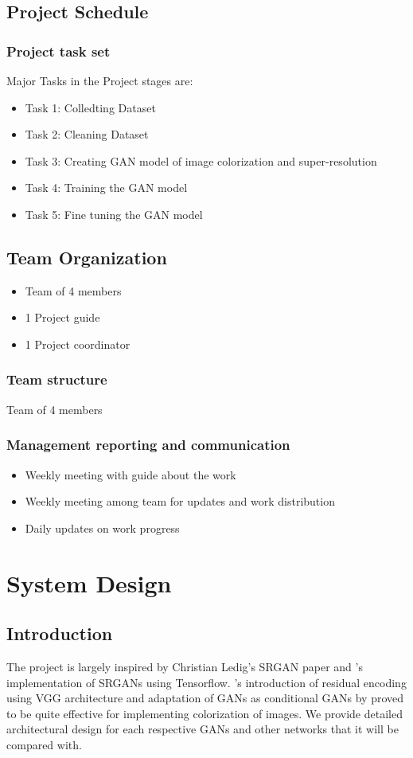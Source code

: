 \documentclass[oneside,a4paper,12pt]{report}
\begin{document}
\newpage
\section{Project Schedule}
\subsection{Project task set}
Major Tasks in the Project stages are:
\begin{itemize}
  \item Task 1: Colledting Dataset
  \item Task 2: Cleaning Dataset
  \item Task 3: Creating GAN model of image colorization and super-resolution
  \item Task 4: Training  the GAN model
  \item Task 5: Fine tuning the GAN model
\end{itemize}


\section{Team Organization}
\begin{itemize}
\item Team of 4 members
\item 1 Project guide
\item 1 Project coordinator
\end{itemize}
\subsection{Team structure}
Team of 4 members

\subsection{Management reporting and communication}
\begin{itemize}
\item Weekly meeting with guide about the work
\item Weekly meeting among team for updates and work distribution
\item Daily updates on work progress
\end{itemize}


\chapter{System Design}
 \section{Introduction}
\hspace*{0.25 in}The project is largely inspired by Christian Ledig's SRGAN paper \citep{ledig2017photorealistic} and \citet{dong2014super}'s implementation of SRGANs using Tensorflow. \citet{dahl2016automatic}'s introduction of residual encoding using VGG architecture and adaptation of GANs as conditional GANs by \citet{mirza2014conditional} proved to be quite effective for implementing colorization of images. We provide detailed architectural design for each respective GANs and other networks that it will be compared with.
\end{document}
